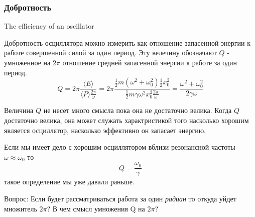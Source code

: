 \documentclass[12pt]{article}
\begin{document}
\subsubsection{Добротность}

The efficiency of an oscillator

\medskip

Добротность осциллятора можно измерить как отношение запасенной энергии к работе совершенной силой за один период. Эту велечину обозначают \(Q\) - умноженное на \(2\pi\) отношение средней запасенной энергии к работе за один период.
\[
    Q
    =
    2\pi \frac
    {\langle E \rangle}
    {\langle P \rangle \frac{2\pi}{\omega}}
    = 
    2\pi \frac
    {\frac{1}{2} m (\omega^2 + \omega_0^2) \frac{1}{2} x_0^2}
    {\frac{1}{2} m \gamma \omega^2 x_0^2 \frac{2\pi}{\omega}}
    =
    \frac 
    {\omega^2 + \omega_0^2}
    {2 \gamma \omega}
\]

Величина \(Q\) не несет много смысла пока она не достаточно велика. Когда \(Q\) достаточно велика, она может служать характристикой того насколько хорошим является осциллятор, насколько эффективно он запасает энергию. 

Если мы имеет дело с хорошим осциллятором вблизи резонансной частоты \(\omega \approx \omega_0\) то
\[
    Q = \frac{\omega_0}{\gamma}
\]
такое определение мы уже давали раньше.

\medskip

Вопрос: Если  будет рассматриваться работа за один \textit{радиан} то откуда уйдет множитель \(2\pi\)?
В чем смысл умножения Q на \(2\pi\)?
\end{document}
